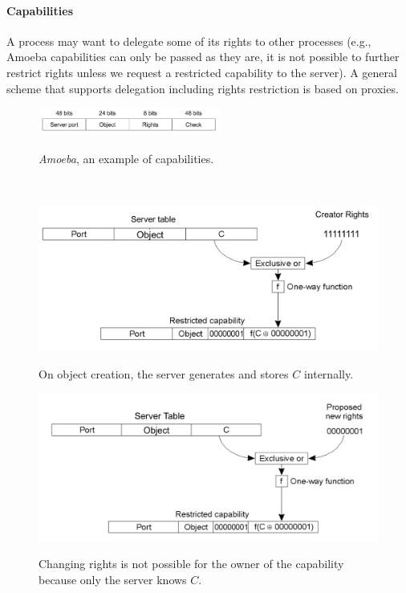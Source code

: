 \documentclass[10pt,a4paper]{article}
\begin{document}
\paragraph{Capabilities}
A process may want to delegate some of its rights to other processes (e.g., Amoeba capabilities can only be passed as they are, it is not possible to further restrict rights unless we request a restricted capability to the server). A general scheme that supports delegation including rights restriction is based on proxies. 
\begin{figure}[h!]\hfill \includegraphics[width=170pt]{images/capabilities.png}\hspace*{\fill}
  \label{fig:capabilities}
  \caption{\textit{Amoeba}, an example of capabilities.}
\end{figure} \\
\begin{figure}[h!]
\centering
\begin{minipage}{.5\textwidth}
  \centering
  \includegraphics[width=.8\linewidth]{images/capabilities2.png}
  \label{fig:capabilities2}
  \caption{On object creation, the server generates and stores $C$ internally.}
\end{minipage}%
\begin{minipage}{.5\textwidth}
  \centering
  \includegraphics[width=.8\linewidth]{images/capabilities3.png}
  \label{fig:capabilities3}
  \caption{Changing rights is not possible for the owner of the capability because only the server knows $C$.}
\end{minipage}
\end{figure} 
\end{document}
